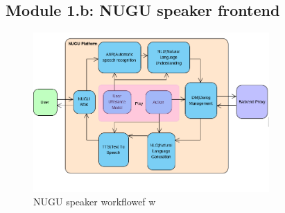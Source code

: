 \documentclass[conference]{IEEEtran}
\begin{document}
\subsection{Module 1.b: NUGU speaker frontend}
\begin{figure}[htbp]
\centerline{\includegraphics[width=90mm,scale=0.5]{fig/6_7.png}}
\caption{NUGU speaker workflowef w}
\label{fig}
\end{figure}
\end{document}
